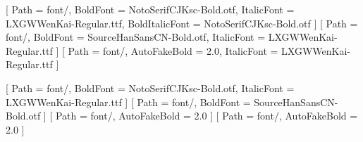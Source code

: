 [    %
  Path           = font/,                       %
  BoldFont       = NotoSerifCJKsc-Bold.otf,     %
  ItalicFont     = LXGWWenKai-Regular.ttf,      %
  BoldItalicFont = NotoSerifCJKsc-Bold.otf      %
]
[   %
  Path           = font/,                       %
  BoldFont       = SourceHanSansCN-Bold.otf,    %
  ItalicFont     = LXGWWenKai-Regular.ttf       %
]
[    %
  Path           = font/,                       %
  AutoFakeBold   = 2.0,                         %
  ItalicFont     = LXGWWenKai-Regular.ttf       %
]

[  %
  Path           = font/,                       %
  BoldFont       = NotoSerifCJKsc-Bold.otf,     %
  ItalicFont     = LXGWWenKai-Regular.ttf       %
]
[  %
  Path           = font/,                       %
  BoldFont       = SourceHanSansCN-Bold.otf     %
]
[       %
  Path           = font/,                       %
  AutoFakeBold   = 2.0                          %
]
[    %
  Path           = font/,                       %
  AutoFakeBold   = 2.0                          %
]

